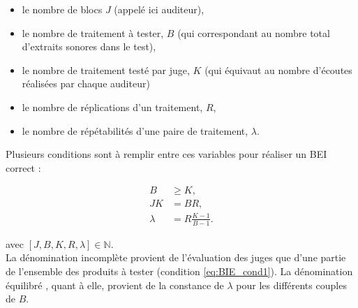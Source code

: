 \begin{itemize}
\item le nombre de blocs $J$ (appelé ici auditeur),
\item le nombre de traitement à tester, $B$ (qui correspondant au nombre total d'extraits sonores dans le test),
\item le nombre de traitement testé par juge, $K$ (qui équivaut au nombre d'écoutes réalisées par chaque auditeur)
\item le nombre de réplications d'un traitement, $R$,
\item le nombre de répétabilités d'une paire de traitement, $\lambda$.\\
\end{itemize}

Plusieurs conditions sont à remplir entre ces variables pour réaliser un BEI correct :

\begin{subequations}\label{BIE_cond}
\begin{align}
B &\geq K, \label{eq:BIE_cond1}\\
JK &= BR, \label{eq:BIE_cond2}\\
\lambda &= R\frac{K-1}{B-1}. \label{eq:BIE_cond3}
\end{align}
\end{subequations}

avec $\left[J, B, K, R, \lambda\right] \in \mathbb{N}$.\\

La dénomination \og incomplète \fg{} provient de l'évaluation des juges que d'une partie de l'ensemble des produits à tester (condition \ref{eq:BIE_cond1}). La dénomination \og équilibré \fg{}, quant à elle, provient de la constance de $\lambda$ pour les différents couples de $B$. \\


